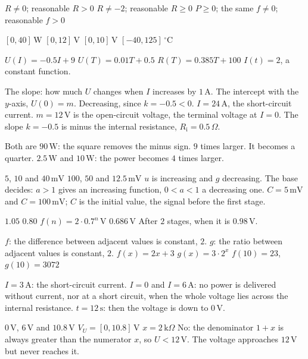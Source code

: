 \begin{facit}
  $R \neq 0$; reasonable $R > 0$  $R \neq -2$; reasonable $R \geq 0$
 $P \geq 0$; the same  $f \neq 0$; reasonable $f > 0$

  $[0, 40]\,\text{W}$  $[0, 12]\,\text{V}$  $[0, 10]\,\text{V}$
 $[-40, 125]\,^{\circ}\text{C}$

  $U(I) = -0.5I + 9$  $U(T) = 0.01T + 0.5$
 $R(T) = 0.385T + 100$  $I(t) = 2$, a constant function.

  The slope: how much $U$ changes when $I$ increases by $1\,\text{A}$.
 The intercept with the $y$-axis, $U(0) = m$.
 Decreasing, since $k = -0.5 < 0$.
 $I = 24\,\text{A}$, the short-circuit current.
 $m = 12\,\text{V}$ is the open-circuit voltage, the terminal voltage at $I = 0$. The slope
$k = -0.5$ is minus the internal resistance, $R_{\text{i}} = 0.5\,\Omega$.

  Both are $90\,\text{W}$: the square removes the minus sign.
 $9$ times larger.  It becomes a quarter.
 $2.5\,\text{W}$ and $10\,\text{W}$: the power becomes $4$ times larger.

  $5$, $10$ and $40\,\text{mV}$  $100$, $50$ and $12.5\,\text{mV}$
 $u$ is increasing and $g$ decreasing. The base decides: $a > 1$ gives an increasing function,
$0 < a < 1$ a decreasing one.
 $C = 5\,\text{mV}$ and $C = 100\,\text{mV}$; $C$ is the initial value, the signal before
the first stage.

  $1.05$  $0.80$  $f(n) = 2 \cdot 0.7^n\,\text{V}$
 $0.686\,\text{V}$  After $2$ stages, when it is $0.98\,\text{V}$.

  $f$: the difference between adjacent values is constant, $2$.
 $g$: the ratio between adjacent values is constant, $2$.
 $f(x) = 2x + 3$  $g(x) = 3 \cdot 2^x$  $f(10) = 23$, $g(10) = 3072$

  $I = 3\,\text{A}$: the short-circuit current.
 $I = 0$ and $I = 6\,\text{A}$: no power is delivered without current, nor at a short
circuit, when the whole voltage lies across the internal resistance.
 $t = 12\,\text{s}$: then the voltage is down to $0\,\text{V}$.

  $0\,\text{V}$, $6\,\text{V}$ and $10.8\,\text{V}$
 $V_U = [0, 10.8]\,\text{V}$
 $x = 2\,\text{k}\Omega$
 No: the denominator $1 + x$ is always greater than the numerator $x$, so
$U < 12\,\text{V}$. The voltage approaches $12\,\text{V}$ but never reaches it.


\end{facit}
